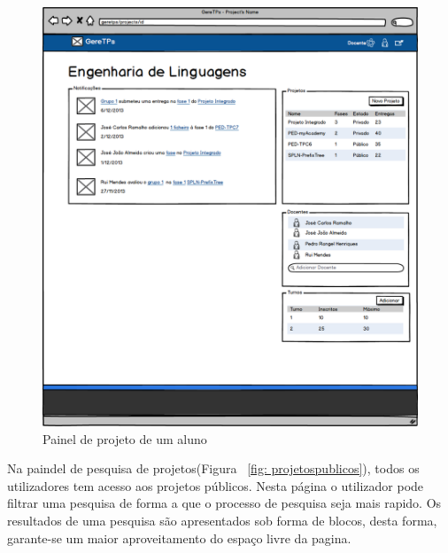 \begin{figure}[htbp] 
        \centering
        \includegraphics[width=1\textwidth]{images/prototipos/mockups/cursodocente.png}
         \caption{Painel de projeto de um aluno}
         \label{fig: cursodocente}
\end{figure}

Na paindel de pesquisa de projetos(Figura ~\ref{fig: projetospublicos}), todos os utilizadores tem acesso aos projetos públicos. Nesta página o utilizador pode filtrar uma pesquisa de forma a que o processo de pesquisa seja mais rapido. Os resultados de uma pesquisa são apresentados sob forma de blocos, desta forma, garante-se um maior aproveitamento do espaço livre da pagina.\\ 

